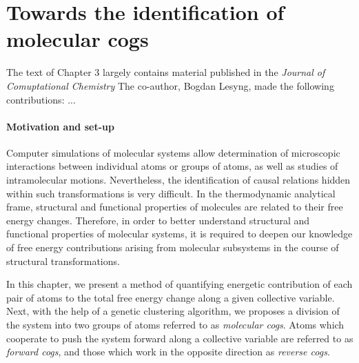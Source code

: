 \documentclass[a4paper,11pt,twoside]{book}%
\begin{document}



\newenvironment{packeditemize}
{ \begin{itemize}
    \setlength{\itemsep}{1.5pt}
    \setlength{\parskip}{1.5pt}
    \setlength{\parsep}{1.5pt}     }
{ \end{itemize}                  } 

\newenvironment{packedenum}
{ \begin{enumerate}
    \setlength{\itemsep}{1.5pt}
    \setlength{\parskip}{1.5pt}
    \setlength{\parsep}{1.5pt}     }
{ \end{enumerate}                  } 


\newcommand{\specialcell}[2][c]{%
  \begin{tabular}[#1]{@{}c@{}}#2\end{tabular}}


  
\chapter{Towards the identification of molecular cogs}

The text of Chapter 3 largely contains material published in the \emph{Journal of Comuptational Chemistry}%
The co-author, Bogdan Lesyng, made the following contributions: ...

\subsubsection{Motivation and set-up}

Computer simulations of molecular systems allow determination of microscopic interactions between individual atoms or groups of atoms, as well as studies of intramolecular motions. 
Nevertheless, the identification of causal relations hidden within such transformations is very difficult.
In the thermodynamic analytical frame, structural and functional properties of molecules are related to their free energy changes.
Therefore, in order to better understand structural and functional properties of molecular systems, it is required to deepen our knowledge of free energy contributions arising from molecular subsystems in the course of structural transformations.

In this chapter, we present a method of quantifying energetic contribution of each pair of atoms to the total free energy change along a given collective variable.
Next, with the help of a genetic clustering algorithm, we proposes a division of the system into two groups of atoms referred to as \emph{molecular cogs}.
Atoms which cooperate to push the system forward along a collective variable are referred to as \emph{forward cogs}, and those which work in the opposite direction as \emph{reverse cogs}.
\end{document}
